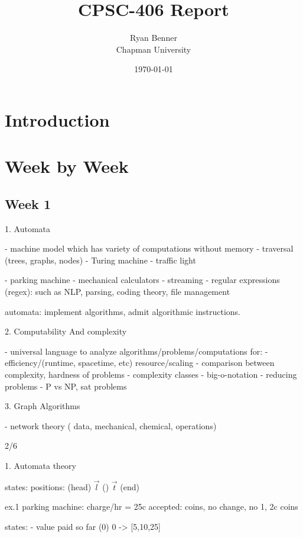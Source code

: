 \documentclass{article}
\title{CPSC-406 Report}
\author{Ryan Benner  \\ Chapman University}
\date{\today}
\theoremstyle{theorem}
\theoremstyle{definition}
\theoremstyle{remark}
\begin{document}
\maketitle

\begin{abstract}
\end{abstract}

\setcounter{tocdepth}{3}
\tableofcontents

\section{Introduction}\label{intro}

\section{Week by Week}\label{homework}

\subsection{Week 1}

1. Automata

- machine model which has variety of computations without memory
- traversal (trees, graphs, nodes)
- Turing machine
- traffic light

- parking machine
- mechanical calculators
- streaming
- regular expressions (regex): such as NLP, parsing, coding theory, file management

automata: implement algorithms, admit algorithmic instructions.


2. Computability And complexity

- universal language to analyze algorithms/problems/computations for:
- efficiency/(runtime, spacetime, etc) resource/scaling
- comparison between complexity, hardness of problems
- complexity classes
- big-o-notation
- reducing problems
- P vs NP, sat problems

3. Graph Algorithms

- network theory ( data, mechanical, chemical, operations)

2/6

1. Automata theory

states: positions: (head) $\overrightarrow{l}$  () $\overrightarrow{t}$  (end)

ex.1 parking machine:
charge/hr = 25c
accepted: coins, no change, no 1, 2c coins

states:
- value paid so far (0)
0 -> [5,10,25]
\end{document}
